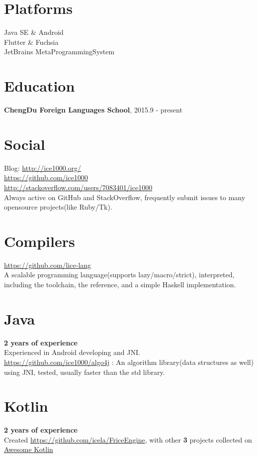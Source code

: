 \documentclass[margin, line]{res}
\begin{document}
\begin{resume}
  \section{\sc Platforms}
  Java SE \& Android \\
  Flutter \& Fuchsia \\
  JetBrains MetaProgrammingSystem

  \section{\sc Education}
  \textbf{ChengDu Foreign Languages School}, 2015.9 - present

  \section{\sc Social}
  Blog: \url{http://ice1000.org/} \\
  \url{https://github.com/ice1000} \\
  \url{http://stackoverflow.com/users/7083401/ice1000} \\
  Always active on GitHub and StackOverflow, frequently submit issues to many opensource projects(like Ruby/Tk).

  \section{\sc Compilers}
  \url{https://github.com/lice-lang} \\
  A scalable programming language(supports lazy/macro/strict), interpreted,
  including the toolchain, the reference, and a simple Haskell implementation.

  \section{\sc Java}
  \textbf{2 years of experience} \\
  Experienced in Android developing and JNI. \\
  \url{https://github.com/ice1000/algo4j} :
  An algorithm library(data structures as well) using JNI, tested, usually faster than the std library.
  
  \section{\sc Kotlin}
  \textbf{2 years of experience} \\
  Created
  \url{https://github.com/icela/FriceEngine},
  with other
  \textbf{3} projects collected on
  \href{https://kotlin.link/?q=ice} {Awesome Kotlin}


\end{resume}
\end{document}
